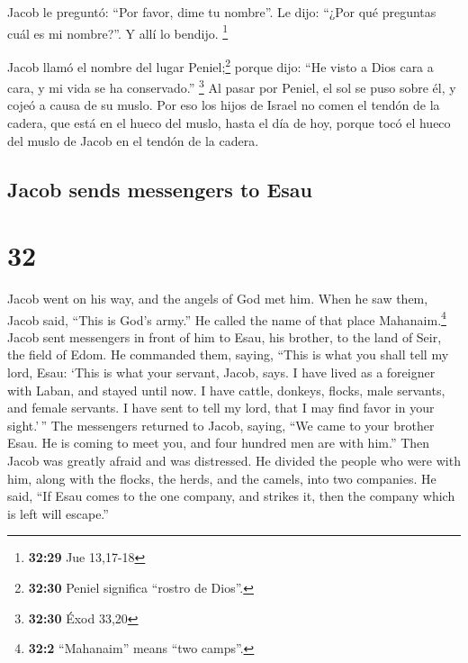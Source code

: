 \begin{paracol}{2}
 Jacob le preguntó: ``Por favor, dime tu nombre''. Le
dijo: ``¿Por qué preguntas cuál es mi nombre?''. Y allí lo bendijo.
\footnote{\textbf{32:29} Jue 13,17-18}

 Jacob llamó el nombre del lugar Peniel;\footnote{\textbf{32:30}
  Peniel significa ``rostro de Dios''.} porque dijo: ``He visto a Dios
cara a cara, y mi vida se ha conservado.'' \footnote{\textbf{32:30} Éxod
  33,20}  Al pasar por Peniel, el sol se puso sobre él, y
cojeó a causa de su muslo.  Por eso los hijos de Israel
no comen el tendón de la cadera, que está en el hueco del muslo, hasta
el día de hoy, porque tocó el hueco del muslo de Jacob en el tendón de
la cadera.

\switchcolumn
\begin{otherlanguage}{english}

\hypertarget{jacob-sends-messengers-to-esau}{%
\subsection{Jacob sends messengers to
Esau}\label{jacob-sends-messengers-to-esau}}

\hypertarget{section-63}{%
\section{32}\label{section-63}}

 Jacob went on his way, and the angels of God met him.
 When he saw them, Jacob said, ``This is God's army.'' He
called the name of that place Mahanaim.\footnote{\textbf{32:2}
  ``Mahanaim'' means ``two camps''.}  Jacob sent
messengers in front of him to Esau, his brother, to the land of Seir,
the field of Edom.  He commanded them, saying, ``This is
what you shall tell my lord, Esau: `This is what your servant, Jacob,
says. I have lived as a foreigner with Laban, and stayed until now.
 I have cattle, donkeys, flocks, male servants, and female
servants. I have sent to tell my lord, that I may find favor in your
sight.'\,''  The messengers returned to Jacob, saying,
``We came to your brother Esau. He is coming to meet you, and four
hundred men are with him.''  Then Jacob was greatly afraid
and was distressed. He divided the people who were with him, along with
the flocks, the herds, and the camels, into two companies.
 He said, ``If Esau comes to the one company, and strikes
it, then the company which is left will escape.''


\end{otherlanguage}
\end{paracol}
